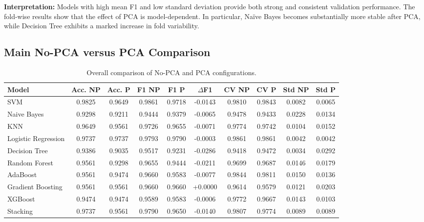 \documentclass[12pt,a4paper]{article}
\begin{document}
\textbf{Interpretation:} Models with high mean F1 and low standard deviation provide both strong and consistent validation performance. The fold-wise results show that the effect of PCA is model-dependent. In particular, Na\"ive Bayes becomes substantially more stable after PCA, while Decision Tree exhibits a marked increase in fold variability.

\subsection{Main No-PCA versus PCA Comparison}
\begin{longtable}{|p{2.5cm}|c|c|c|c|c|c|c|c|c|}
\caption{Overall comparison of No-PCA and PCA configurations.}\\
\hline
\textbf{Model} & \textbf{Acc. NP} & \textbf{Acc. P} & \textbf{F1 NP} & \textbf{F1 P} & \textbf{$\Delta$F1} & \textbf{CV NP} & \textbf{CV P} & \textbf{Std NP} & \textbf{Std P}\\ \hline
SVM & 0.9825 & 0.9649 & 0.9861 & 0.9718 & -0.0143 & 0.9810 & 0.9843 & 0.0082 & 0.0065 \\
Naive Bayes & 0.9298 & 0.9211 & 0.9444 & 0.9379 & -0.0065 & 0.9478 & 0.9433 & 0.0228 & 0.0134 \\
KNN & 0.9649 & 0.9561 & 0.9726 & 0.9655 & -0.0071 & 0.9774 & 0.9742 & 0.0104 & 0.0152 \\
Logistic Regression & 0.9737 & 0.9737 & 0.9793 & 0.9790 & -0.0003 & 0.9861 & 0.9861 & 0.0042 & 0.0042 \\
Decision Tree & 0.9386 & 0.9035 & 0.9517 & 0.9231 & -0.0286 & 0.9418 & 0.9472 & 0.0034 & 0.0292 \\
Random Forest & 0.9561 & 0.9298 & 0.9655 & 0.9444 & -0.0211 & 0.9699 & 0.9687 & 0.0146 & 0.0179 \\
AdaBoost & 0.9561 & 0.9474 & 0.9660 & 0.9583 & -0.0077 & 0.9844 & 0.9811 & 0.0150 & 0.0136 \\
Gradient Boosting & 0.9561 & 0.9561 & 0.9660 & 0.9660 & +0.0000 & 0.9614 & 0.9579 & 0.0121 & 0.0203 \\
XGBoost & 0.9474 & 0.9474 & 0.9589 & 0.9583 & -0.0006 & 0.9772 & 0.9667 & 0.0143 & 0.0103 \\
Stacking & 0.9737 & 0.9561 & 0.9790 & 0.9650 & -0.0140 & 0.9807 & 0.9774 & 0.0089 & 0.0089 \\
\hline
\end{longtable}
\end{document}

